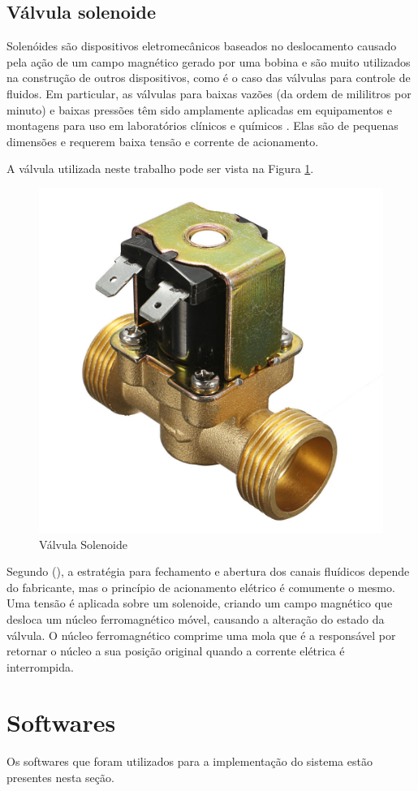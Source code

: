\newpage

\subsection{Válvula solenoide}

Solenóides são dispositivos eletromecânicos baseados no deslocamento causado pela ação de um campo magnético gerado por uma bobina e são muito utilizados na construção de outros dispositivos, como é o caso das válvulas para controle de fluidos. Em particular, as válvulas para baixas vazões (da ordem de mililitros por minuto) e baixas pressões têm sido amplamente aplicadas em equipamentos e montagens para uso em laboratórios clínicos e químicos  \cite{da2002modulo}. Elas são de pequenas dimensões e requerem baixa tensão e corrente de acionamento.

A válvula utilizada neste trabalho pode ser vista na Figura \ref{fig:valvula-solenoide}.

\begin{figure}[htbp]
	\centering
	\includegraphics[width=0.3\linewidth]{figuras/valvula-solenoide.jpg}
	\caption{Válvula Solenoide}
	\label{fig:valvula-solenoide}
\end{figure}

\newpage

Segundo \citeauthor{da2002modulo} (\citeyear{da2002modulo}), a estratégia para fechamento e abertura dos canais fluídicos depende do fabricante, mas o princípio de acionamento elétrico é comumente o mesmo. Uma tensão é aplicada sobre um solenoide, criando um campo magnético que desloca um núcleo ferromagnético móvel, causando a alteração do estado da válvula. O núcleo
ferromagnético comprime uma mola que é a responsável por retornar o núcleo a sua posição original quando a corrente elétrica é interrompida.

\section{Softwares}

Os softwares que foram utilizados para a implementação do sistema estão presentes nesta seção.

